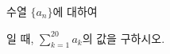 수열 $\{a_n\}$에 대하여\par\smallskip{}\par\smallskip\noindent 일 때, $\displaystyle\sum_{k=1}^{20} a_k$의 값을 구하시오.
